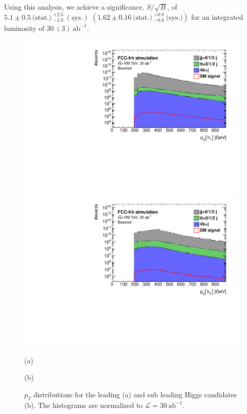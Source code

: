 Using this analysis, we achieve a significance, $S/\sqrt{B}$, of $5.1\pm0.5~\text{(stat.)}~ ^{+2.5}_{-1.8}~(\text{sys.})$ $\left(1.62\pm 0.16~\text{(stat.)}~^{+0.8}_{-0.6}~\text{(sys.)}\right)$ for an integrated luminosity of $30~(3)~\text{ab}^{-1}$.

\begin{figure}
	\centering
	\begin{minipage}{.5\textwidth}
		\centering
		\includegraphics[trim={.65cm 0 0 0},clip,width=\linewidth]{./Figures/hist_h1_pt_stack.pdf}
	\end{minipage}%
	\begin{minipage}{.5\textwidth}
		\centering
		\includegraphics[trim={0 0 .65cm 0},clip,width=\linewidth]{./Figures/hist_h2_pt_stack.pdf}
	\end{minipage}
	\begin{minipage}[t]{0.5\textwidth}
		\caption*{(a)}
	\end{minipage}%
	\hfill
	\begin{minipage}[t]{0.5\textwidth}
		\caption*{(b)}
	\end{minipage}
	\caption{$p_T$ distributions for the leading (a) and sub leading Higgs candidates (b). The histograms are normalized to $\mathcal{L}=30~\text{ab}^{-1}$.}
	\label{fig:pt_stack}
\end{figure} 

